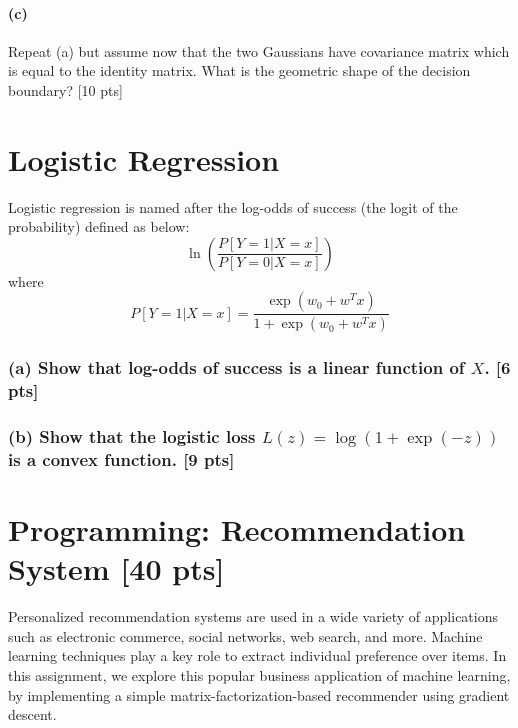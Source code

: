 \documentclass[twoside,10pt]{article}
\begin{document}
\paragraph{(c)} Repeat (a) but assume now that the two Gaussians have covariance
matrix which is equal to the identity matrix. What is the geometric
shape of the decision boundary? [10 pts]

\vspace{1cm}



\section{Logistic Regression} 
Logistic regression is named after the log-odds of success (the logit of the probability) defined as below:
\begin{equation}
\ln \left( \frac{P[Y=1|X=x]}{P[Y=0|X=x]}\right) \nonumber
\end{equation}
where 
\[P[Y=1|X=x]=\frac{\exp(w_0+w^Tx)}{1+\exp(w_0+w^Tx)}\]
\subsubsection*{(a) Show that log-odds of success is a linear function of $X$. [6 pts]}

\vspace{1cm}

\subsubsection*{(b) Show that the logistic loss $L(z) = \log \left(  1 + \exp(-z)  \right)$ is a convex function. [9 pts]}

\vspace{1cm}



\section{Programming: Recommendation System [40 pts]}

Personalized recommendation systems are used in a wide variety of
applications such as electronic commerce, social networks, web
search, and more. Machine learning techniques play a key role to
extract individual preference over items. In this assignment, we
explore this popular business application of machine learning, by
implementing a simple matrix-factorization-based recommender using
gradient descent.
\end{document}
